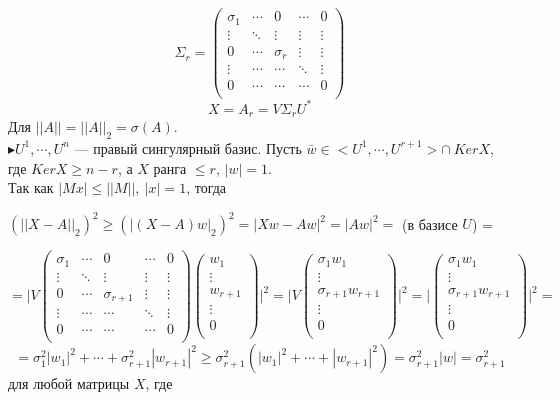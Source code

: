 \documentclass[12pt]{article}
\theoremstyle{definition}
\numberwithin{equation}{section}
\begin{document}
\[\Sigma_r=\begin{pmatrix}
\sigma_1 & \cdots & 0  & \cdots & 0\\
\vdots & \ddots & \vdots & \vdots & \vdots\\
0 & \cdots & \sigma_r &  \vdots & \vdots\\
\vdots & \cdots & \cdots & \ddots & \vdots\\
0 & \cdots & \cdots & \cdots & 0\\
\end{pmatrix}\]
$$X=A_r=V\Sigma_r U^*$$
Для $||A||=||A||_2=\sigma(A)$. \\
$\blacktriangleright U^1,\cdots, U^n$ --- правый сингулярный базис.
Пусть $\bar w \in <U^1,\cdots,U^{r+1}> \cap~ Ker X$, где $Ker X \geqslant n-r$, а $X$ ранга $\leqslant r$, $|w|=1$.\\
Так как $|Mx|\leqslant ||M||,~|x|=1$, тогда \begin{center}
$(||X-A||_2)^2 \geqslant(|(X-A)w|_2)^2=|Xw-Aw|^2=|Aw|^2=$ (в базисе $U$) =
\end{center}
\[=\Bigg| V\begin{pmatrix}
\sigma_1 & \cdots & 0  & \cdots & 0\\
\vdots & \ddots & \vdots & \vdots & \vdots\\
0 & \cdots & \sigma_{r+1} &  \vdots & \vdots\\
\vdots & \cdots & \cdots & \ddots & \vdots\\
0 & \cdots & \cdots & \cdots & 0\\
\end{pmatrix} \begin{pmatrix}
w_1\\
\vdots\\
w_{r+1}\\
\vdots\\
0\\
\end{pmatrix}\Bigg|^2 =\Bigg|V \begin{pmatrix}
\sigma_1 w_1\\
\vdots\\
\sigma_{r+1} w_{r+1}\\
\vdots\\
0\\
\end{pmatrix} \Bigg|^2 =\Bigg| \begin{pmatrix}
\sigma_1 w_1\\
\vdots\\
\sigma_{r+1} w_{r+1}\\
\vdots\\
0\\
\end{pmatrix} \Bigg|^2=\]$$=\sigma_1^2|w_1|^2+\cdots+\sigma_{r+1}^2|w_{r+1}|^2 \geqslant \sigma_{r+1}^2(|w_1|^2+\cdots+|w_{r+1}|^2)=\sigma_{r+1}^2|w|=\sigma_{r+1}^2$$ для любой матрицы $X$, где 
\end{document}
